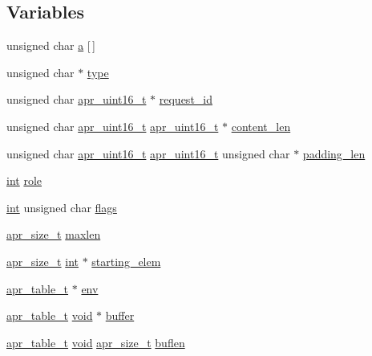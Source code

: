 \subsection*{Variables}
\begin{DoxyCompactItemize}
\item 
unsigned char \hyperlink{group__APACHE__CORE__FASTCGI_ga72a200675828d2c2550eb6c686b9db49}{a} \mbox{[}$\,$\mbox{]}
\item 
unsigned char $\ast$ \hyperlink{group__APACHE__CORE__FASTCGI_gaa5044999f3339d2ba3b1bf22fa6cfe95}{type}
\item 
unsigned char \hyperlink{group__apr__platform_ga3fb87c977e28a526d872d1081411b129}{apr\+\_\+uint16\+\_\+t} $\ast$ \hyperlink{group__APACHE__CORE__FASTCGI_ga7cf1c5551e313631cefe3e87006af0ce}{request\+\_\+id}
\item 
unsigned char \hyperlink{group__apr__platform_ga3fb87c977e28a526d872d1081411b129}{apr\+\_\+uint16\+\_\+t} \hyperlink{group__apr__platform_ga3fb87c977e28a526d872d1081411b129}{apr\+\_\+uint16\+\_\+t} $\ast$ \hyperlink{group__APACHE__CORE__FASTCGI_ga77f9d7cb7438587f556675ecd9b18e8a}{content\+\_\+len}
\item 
unsigned char \hyperlink{group__apr__platform_ga3fb87c977e28a526d872d1081411b129}{apr\+\_\+uint16\+\_\+t} \hyperlink{group__apr__platform_ga3fb87c977e28a526d872d1081411b129}{apr\+\_\+uint16\+\_\+t} unsigned char $\ast$ \hyperlink{group__APACHE__CORE__FASTCGI_ga02211035748387ac9d2576da9da159fb}{padding\+\_\+len}
\item 
\hyperlink{pcre_8txt_a42dfa4ff673c82d8efe7144098fbc198}{int} \hyperlink{group__APACHE__CORE__FASTCGI_gaea7921a9aa2757a88e843476848ddd55}{role}
\item 
\hyperlink{pcre_8txt_a42dfa4ff673c82d8efe7144098fbc198}{int} unsigned char \hyperlink{group__APACHE__CORE__FASTCGI_gac2156b926db9b93ef56c9b1e537db8cd}{flags}
\item 
\hyperlink{group__apr__platform_gaaa72b2253f6f3032cefea5712a27540e}{apr\+\_\+size\+\_\+t} \hyperlink{group__APACHE__CORE__FASTCGI_ga5c048510565a9f2b1d0680d211718866}{maxlen}
\item 
\hyperlink{group__apr__platform_gaaa72b2253f6f3032cefea5712a27540e}{apr\+\_\+size\+\_\+t} \hyperlink{pcre_8txt_a42dfa4ff673c82d8efe7144098fbc198}{int} $\ast$ \hyperlink{group__APACHE__CORE__FASTCGI_gadc14a4857824ff246ce1816439a3f57e}{starting\+\_\+elem}
\item 
\hyperlink{structapr__table__t}{apr\+\_\+table\+\_\+t} $\ast$ \hyperlink{group__APACHE__CORE__FASTCGI_gac7a8e4f5bea9483c4eebdd1349a2a671}{env}
\item 
\hyperlink{structapr__table__t}{apr\+\_\+table\+\_\+t} \hyperlink{group__MOD__ISAPI_gacd6cdbf73df3d9eed42fa493d9b621a6}{void} $\ast$ \hyperlink{group__APACHE__CORE__FASTCGI_gaf7962cd92709f12210a7090813eec89c}{buffer}
\item 
\hyperlink{structapr__table__t}{apr\+\_\+table\+\_\+t} \hyperlink{group__MOD__ISAPI_gacd6cdbf73df3d9eed42fa493d9b621a6}{void} \hyperlink{group__apr__platform_gaaa72b2253f6f3032cefea5712a27540e}{apr\+\_\+size\+\_\+t} \hyperlink{group__APACHE__CORE__FASTCGI_ga42d3840f253e70bd59e01d90575ccc24}{buflen}
\end{DoxyCompactItemize}


